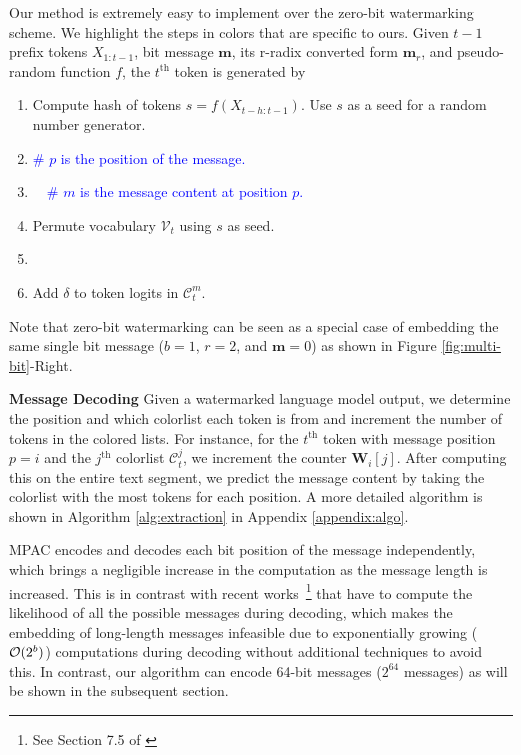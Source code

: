 Our method is extremely easy to implement over the zero-bit watermarking scheme. We highlight the steps in colors that are specific to ours. Given $t-1$ prefix tokens $X_{1:t-1}$, bit message $\mathbf{m}$, its r-radix converted  form $\mathbf{m}_r$, and pseudo-random function $f$, the $t^\text{th}$ token is generated by 







\begin{enumerate}[noitemsep]
    \item Compute hash of tokens $s=f(X_{t-h:t-1})$. Use $s$ as a seed for a random number generator.
    \item {} \textcolor{blue}{\qquad \# $p$ is the position of the message.}
    \item {} \textcolor{blue}{\qquad\qquad \ \ \# $m$ is the message content at position $p$.}
    \item Permute vocabulary $\mathcal{V}_t$ using $s$ as seed.
    \item {}
    \item Add $\delta$ to token logits in $\mathcal{C}_t^{m}$.
\end{enumerate}

\noindent Note that zero-bit watermarking can be seen as a special case of embedding the same single bit message ($b=1$, $r=2$, and $\mathbf{m}=0$) as shown in Figure \ref{fig:multi-bit}-Right. 

\noindent \textbf{Message Decoding}
Given a watermarked language model output, we determine the position and which colorlist each token is from and increment the number of tokens in the colored lists. For instance, for the $t^\text{th}$ token with message position $p=i$ and the $j^{\text{th}}$ colorlist $\mathcal{C}_t^j$, we increment the counter $\mathbf{W}_i[j]$. After computing this on the entire text segment, we predict the message content by taking the colorlist with the most tokens for each position. A more detailed algorithm is shown in Algorithm \ref{alg:extraction} in Appendix \ref{appendix:algo}. 

MPAC encodes and decodes each bit position of the message independently, which brings a negligible increase in the computation as the message length is increased. This is in contrast with recent works~\citep{wang2023towards, fernandez2023three}\footnote{See Section 7.5 of \citealp{wang2023towards}
} that have to compute the likelihood of all the possible messages during decoding, which makes the embedding of long-length messages infeasible due to exponentially growing ($\mathcal{O}(2^b)$) computations during decoding without additional techniques to avoid this. In contrast, our algorithm can encode 64-bit messages ($2^{64}$ messages) as will be shown in the subsequent section.



